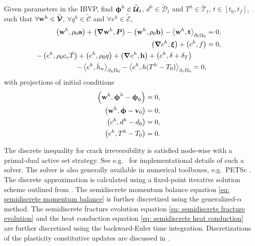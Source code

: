 \begin{mdframed}[
    frametitle={The semidiscrete Galerkin form},
    frametitlebackgroundcolor=gray!20,
    backgroundcolor=gray!5,
    linewidth=0pt,
    nobreak=true
  ]
  Given parameters in the IBVP, find $\boldsymbol{\upphi}^h \in \widetilde{\boldsymbol{\mathcal{U}}}_t$, $d^h \in \widetilde{\mathcal{D}}_t$ and $T^h \in \widetilde{\mathcal{T}}_t$, $t \in [t_0, t_f]$, such that $\forall \textbf{w}^h \in \widetilde{\boldsymbol{\mathcal{V}}}$, $\forall q^h \in \widetilde{\mathcal{C}}$ and $\forall e^h \in \widetilde{\mathcal{E}}$,
  \begin{subequations}
    \begin{align}
      \left( \textbf{w}^h, \rho_0\textbf{a} \right) + \left( \boldsymbol{\nabla} \textbf{w}^h, \boldsymbol{P} \right) - \left( \textbf{w}^h, \rho_0 \textbf{b} \right) - \left< \textbf{w}^h, \textbf{t} \right>_{\partial_t\Omega_0} & = 0, \label{eq: semidiscrete momentum balance}   \\
      \left( \boldsymbol{\nabla} c^h, \boldsymbol{\xi} \right) + \left( c^h, f \right)                                                                                                   & = 0, \label{eq: semidiscrete fracture evolution} \\
      \begin{split}
        - \left( e^h, \rho_0c_v\dot{T} \right) + \left( e^h, \rho_0q \right) + \left( \boldsymbol{\nabla} e^h, \textbf{h} \right) + \left( e^h, \delta+\delta_T \right)& \\
        - \left< e^h, \bar{h}_n \right>_{\partial_h\Omega_0} - \left< e^h, h(T^h-T_0) \right>_{\partial_r\Omega_0} &= 0,
      \end{split} \label{eq: semidiscrete heat conduction}
    \end{align}
  \end{subequations}
  with projections of initial conditions
  \begin{subequations}
    \begin{align}
      \left( \textbf{w}^h, \boldsymbol{\upphi}^h - \boldsymbol{\upphi}_0 \right) & = 0, \\
      \left( \textbf{w}^h, \dot{\boldsymbol{\upphi}} - \textbf{v}_0 \right)             & = 0, \\
      \left( c^h, d^h - d_0 \right)                        & = 0, \\
      \left( e^h, T^h - T_0 \right)                        & = 0. 
    \end{align}
  \end{subequations}
\end{mdframed}
The discrete inequality for crack irreversibility is satisfied node-wise with a primal-dual active set strategy. See e.g.\  \citet{heister2015primal} for implementational details of such a solver. The solver is also generally available in numerical toolboxes, e.g.\  PETSc \cite{petsc-web-page}. The discrete approximation is calculated using a fixed-point iterative solution scheme outlined from \cite{HuGary2020}. The semidiscrete momentum balance equation \eqref{eq: semidiscrete momentum balance} is further discretized using the generalized-$\alpha$ method. The semidiscrete fracture evolution equation \eqref{eq: semidiscrete fracture evolution} and the heat conduction equation \eqref{eq: semidiscrete heat conduction} are further discretized using the backward-Euler time integration. Discretizations of the plasticity constitutive updates are discussed in .
